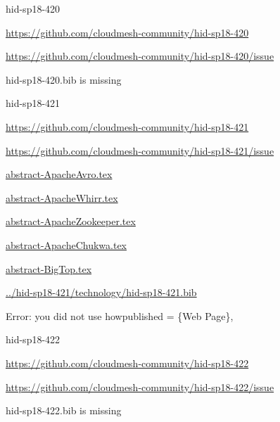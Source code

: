 \begin{IU}

hid-sp18-420

\url{https://github.com/cloudmesh-community/hid-sp18-420}

\url{https://github.com/cloudmesh-community/hid-sp18-420/issue}

hid-sp18-420.bib is missing

\end{IU}


\begin{IU}

hid-sp18-421

\url{https://github.com/cloudmesh-community/hid-sp18-421}

\url{https://github.com/cloudmesh-community/hid-sp18-421/issue}

\href{https://github.com/cloudmesh-community/hid-sp18-421/blob/master//technology/abstract-ApacheAvro.tex}{abstract-ApacheAvro.tex}

\href{https://github.com/cloudmesh-community/hid-sp18-421/blob/master//technology/abstract-ApacheWhirr.tex}{abstract-ApacheWhirr.tex}

\href{https://github.com/cloudmesh-community/hid-sp18-421/blob/master//technology/abstract-ApacheZookeeper.tex}{abstract-ApacheZookeeper.tex}

\href{https://github.com/cloudmesh-community/hid-sp18-421/blob/master//technology/abstract-ApacheChukwa.tex}{abstract-ApacheChukwa.tex}

\href{https://github.com/cloudmesh-community/hid-sp18-421/blob/master//technology/abstract-BigTop.tex}{abstract-BigTop.tex}

\href{https://github.com/cloudmesh-community/hid-sp18-421/blob/master//technology/hid-sp18-421.bib}{../hid-sp18-421/technology/hid-sp18-421.bib}

Error: you did not use howpublished = \{Web Page\},

\end{IU}


\begin{IU}

hid-sp18-422

\url{https://github.com/cloudmesh-community/hid-sp18-422}

\url{https://github.com/cloudmesh-community/hid-sp18-422/issue}

hid-sp18-422.bib is missing

\end{IU}


